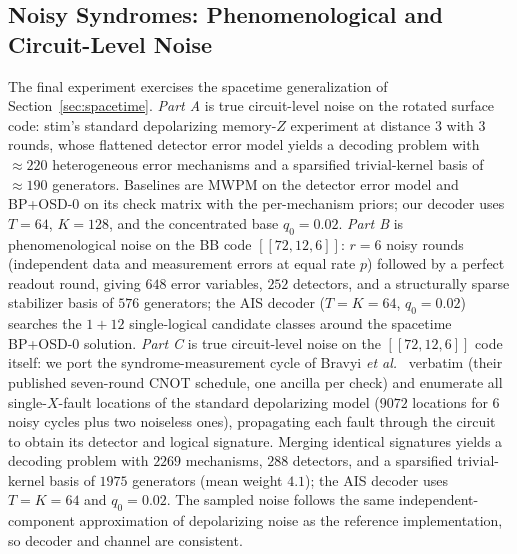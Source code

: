 \documentclass[a4paper,11pt]{quantumarticle}
\theoremstyle{definition}
\begin{document}
\subsection{Noisy Syndromes: Phenomenological and Circuit-Level Noise}
\label{sec:exp4}
The final experiment exercises the spacetime generalization of
Section~\ref{sec:spacetime}. \emph{Part A} is true circuit-level noise on
the rotated surface code: stim's standard depolarizing memory-$Z$
experiment at distance $3$ with $3$ rounds, whose flattened detector error
model yields a decoding problem with $\approx220$ heterogeneous error
mechanisms and a sparsified trivial-kernel basis of $\approx190$
generators. Baselines are MWPM on the detector error model and BP+OSD-0 on
its check matrix with the per-mechanism priors; our decoder uses $T=64$,
$K=128$, and the concentrated base $q_0=0.02$. \emph{Part B} is
phenomenological noise on the BB code $[\![72,12,6]\!]$: $r=6$ noisy
rounds (independent data and measurement errors at equal rate $p$)
followed by a perfect readout round, giving $648$ error variables, $252$
detectors, and a structurally sparse stabilizer basis of $576$ generators;
the AIS decoder ($T=K=64$, $q_0=0.02$) searches the $1+12$ single-logical
candidate classes around the spacetime BP+OSD-0 solution. \emph{Part C} is
true circuit-level noise on the $[\![72,12,6]\!]$ code itself: we port the
syndrome-measurement cycle of Bravyi \emph{et al.}~\cite{bravyi2024}
verbatim (their published seven-round CNOT schedule, one ancilla per
check) and enumerate all single-$X$-fault locations of the standard
depolarizing model ($9072$ locations for $6$ noisy cycles plus two
noiseless ones), propagating each fault through the circuit to obtain its
detector and logical signature. Merging identical signatures yields a
decoding problem with $2269$ mechanisms, $288$ detectors, and a sparsified
trivial-kernel basis of $1975$ generators (mean weight $4.1$); the AIS
decoder uses $T=K=64$ and $q_0=0.02$. The sampled noise follows the same
independent-component approximation of depolarizing noise as the reference
implementation, so decoder and channel are consistent.
\end{document}

